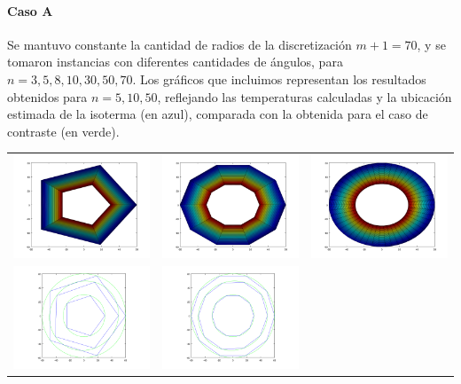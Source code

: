     \paragraph{Caso A} Se mantuvo constante la cantidad de radios de la discretización $m + 1 = 70$, y se tomaron instancias con diferentes cantidades de ángulos, para $n = 3, 5, 8, 10, 30, 50, 70$. Los gráficos que incluimos representan los resultados obtenidos para $n = 5, 10, 50$, reflejando las temperaturas calculadas y la ubicación estimada de la isoterma (en azul), comparada con la obtenida para el caso de contraste (en verde).

    {\centering \begin{tabular}{ccc}
      \includegraphics[width=4.5cm]{graficos/2/2a-5.png} &
      \includegraphics[width=4.5cm]{graficos/2/2a-10.png} &
      \includegraphics[width=4.5cm]{graficos/2/2a-50.png} \\
      \includegraphics[width=4.5cm]{graficos/2/2a-5-iso.png} &
      \includegraphics[width=4.5cm]{graficos/2/2a-10-iso.png} &

\end{tabular}}
